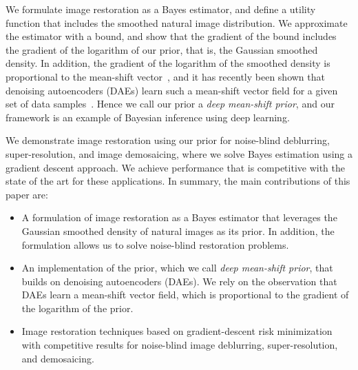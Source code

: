 \documentclass{article}
\begin{document}
We formulate image restoration as a Bayes estimator, and define a utility function that includes the smoothed natural image distribution. We approximate the estimator with a bound, and show that the gradient of the bound includes the gradient of the logarithm of our prior, that is, the Gaussian smoothed density. In addition, the gradient of the logarithm of the smoothed density is proportional to the mean-shift vector~\cite{Comaniciu:2002:MSR}, and it has recently been shown that denoising autoencoders (DAEs) learn such a mean-shift vector field for a given set of data samples~\cite{JMLR:v15:alain14a,bigdeli2017image}. Hence we call our prior a \emph{deep mean-shift prior}, and our framework is an example of Bayesian inference using deep learning.

We demonstrate image restoration using our prior for noise-blind deblurring, super-resolution, and image demosaicing, where we solve Bayes estimation using a gradient descent approach. We achieve performance that is competitive with the state of the art for these applications. In summary, the main contributions of this paper are:
\begin{itemize}
\item A formulation of image restoration as a Bayes estimator that leverages the Gaussian smoothed density of natural images as its prior. In addition, the formulation allows us to solve noise-blind restoration problems.
\item An implementation of the prior, which we call \emph{deep mean-shift prior}, that builds on denoising autoencoders (DAEs). We rely on the observation that DAEs learn a mean-shift vector field, which is proportional to the gradient of the logarithm of the prior.
\item Image restoration techniques based on gradient-descent risk minimization with competitive results for noise-blind image deblurring, super-resolution, and demosaicing.
\end{itemize}
\end{document}
